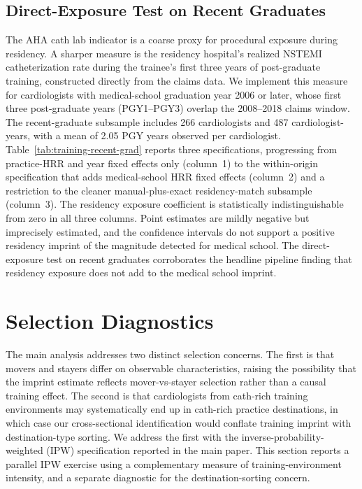 \documentclass[12pt]{article}
\begin{document}
\subsection{Direct-Exposure Test on Recent Graduates}\label{sec:app-recent-grad}

The AHA cath lab indicator is a coarse proxy for procedural exposure during residency. A sharper measure is the residency hospital's realized NSTEMI catheterization rate during the trainee's first three years of post-graduate training, constructed directly from the claims data. We implement this measure for cardiologists with medical-school graduation year 2006 or later, whose first three post-graduate years (PGY1--PGY3) overlap the 2008--2018 claims window. The recent-graduate subsample includes 266 cardiologists and 487 cardiologist-years, with a mean of 2.05 PGY years observed per cardiologist. Table~\ref{tab:training-recent-grad} reports three specifications, progressing from practice-HRR and year fixed effects only (column~1) to the within-origin specification that adds medical-school HRR fixed effects (column~2) and a restriction to the cleaner manual-plus-exact residency-match subsample (column~3). The residency exposure coefficient is statistically indistinguishable from zero in all three columns. Point estimates are mildly negative but imprecisely estimated, and the confidence intervals do not support a positive residency imprint of the magnitude detected for medical school. The direct-exposure test on recent graduates corroborates the headline pipeline finding that residency exposure does not add to the medical school imprint.

\begin{table}[htbp]
\centering
\begin{minipage}[h]{\textwidth}
  \caption{Residency cath rate and own catheterization, recent-graduate subsample}
  \label{tab:training-recent-grad}
  \centering
  
\end{minipage}
\end{table}

\section{Selection Diagnostics}\label{sec:app-ipw}

The main analysis addresses two distinct selection concerns. The first is that movers and stayers differ on observable characteristics, raising the possibility that the imprint estimate reflects mover-vs-stayer selection rather than a causal training effect. The second is that cardiologists from cath-rich training environments may systematically end up in cath-rich practice destinations, in which case our cross-sectional identification would conflate training imprint with destination-type sorting. We address the first with the inverse-probability-weighted (IPW) specification reported in the main paper. This section reports a parallel IPW exercise using a complementary measure of training-environment intensity, and a separate diagnostic for the destination-sorting concern.
\end{document}

